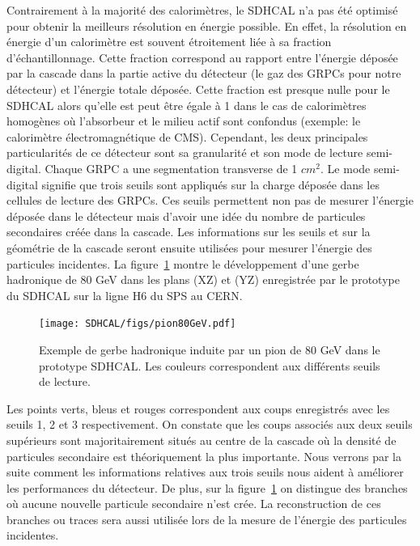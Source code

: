 Contrairement à la majorité des calorimètres, le SDHCAL n'a pas été optimisé pour obtenir la meilleurs résolution en énergie possible. En effet, la résolution en énergie d'un calorimètre est souvent étroitement liée à sa fraction d’échantillonnage. Cette fraction correspond au rapport entre l'énergie déposée par la cascade dans la partie active du détecteur (le gaz des GRPCs pour notre détecteur) et l'énergie totale déposée. Cette fraction est presque nulle pour le SDHCAL alors qu'elle est peut être égale à 1 dans le cas de calorimètres homogènes où l'absorbeur et le milieu actif sont confondus (exemple: le calorimètre électromagnétique de CMS). Cependant, les deux principales particularités de ce détecteur sont sa granularité et son mode de lecture semi-digital. Chaque GRPC a une segmentation transverse de 1 $cm^2$. Le mode semi-digital signifie que trois seuils sont appliqués sur la charge déposée dans les cellules de lecture des GRPCs. Ces seuils permettent non pas de mesurer l’énergie déposée dans le détecteur mais d'avoir une idée du nombre de particules secondaires créée dans la cascade. Les informations sur les seuils et sur la géométrie de la cascade seront ensuite utilisées pour mesurer l'énergie des particules incidentes. La figure~\ref{fig:shower80} montre le développement d'une gerbe hadronique de 80 GeV dans les plans (XZ) et (YZ) enregistrée par le prototype du SDHCAL sur la ligne H6 du SPS au CERN.
\begin{figure}[!h]
  \begin{center}
    \texttt{[image: SDHCAL/figs/pion80GeV.pdf]}
    \caption{Exemple de gerbe hadronique induite par un pion de 80 GeV dans le prototype SDHCAL. Les couleurs correspondent aux différents seuils de lecture.}
    \label{fig:shower80}
  \end{center}
\end{figure}
Les points verts, bleus et rouges correspondent aux coups enregistrés avec les seuils 1, 2 et 3 respectivement. On constate que les coups associés aux deux seuils supérieurs sont majoritairement situés au centre de la cascade où la densité de particules secondaire est théoriquement la plus importante. Nous verrons par la suite comment les informations relatives aux trois seuils nous aident à améliorer les performances du détecteur. De plus, sur la figure~\ref{fig:shower80} on distingue des branches où aucune nouvelle particule secondaire n'est crée. La reconstruction de ces branches ou traces sera aussi utilisée lors de la mesure de l'énergie des particules incidentes.

